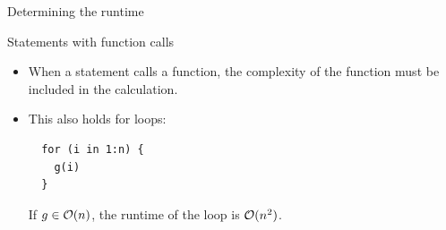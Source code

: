 \documentclass[11pt,compress,t,notes=noshow, xcolor=table]{beamer}
\begin{document}
\begin{vbframe}{Determining the runtime}
\framebreak

\begin{block}{Statements with function calls}
\begin{itemize}
  \item When a statement calls a function, the complexity of the function must be included in the calculation.
  \item This also holds for loops:\\
  \begin{verbatim}
  for (i in 1:n) {
    g(i)
  }
  \end{verbatim}
  If $g \in \mathcal{O}(n)$, the runtime of the loop is $\mathcal{O}(n^2)$.
\end{itemize}

\end{block}

\end{vbframe}
\end{document}
